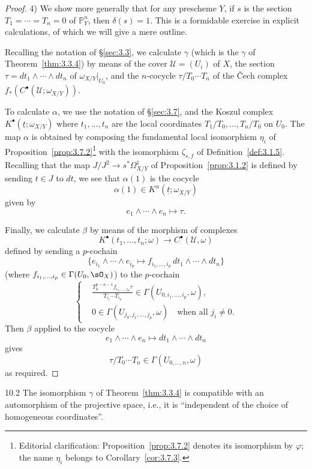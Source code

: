 \begin{proof}
4) We show more generally that for any prescheme $Y$, if $s$ is the section $T_1=\cdots=T_n=0$ of $\mathbb{P}_Y^n$, then $\delta(s)=1$. This is a formidable exercise in explicit calculations, of which we will give a mere outline.

Recalling the notation of \S\ref{sec:3.3}, we calculate $\gamma$ (which is the $\gamma$ of Theorem~\ref{thm:3.3.4}) by means of the cover $\mathcal{U}=(U_i)$ of $X$, the section $\tau=dt_1\wedge\cdots\wedge dt_n$ of $\omega_{X/Y}|_{U_0}$, and the $n$-cocycle $\tau/T_0\cdots T_n$ of the \v{C}ech complex $f_*(C^\bullet(\mathcal{U};\omega_{X/Y}))$.

To calculate $\alpha$, we use the notation of \S\ref{sec:3.7}, and the Koszul complex $K^\bullet(\underline{t};\omega_{X/Y})$ where $t_1,\dots,t_n$ are the local coordinates $T_1/T_0,\dots,T_n/T_0$ on $U_0$. The map $\alpha$ is obtained by composing the fundamental local isomorphism $\eta_i$ of Proposition~\ref{prop:3.7.2}\footnote{Editorial clarification: Proposition~\ref{prop:3.7.2} denotes its isomorphism by $\varphi$; the name $\eta_i$ belongs to Corollary~\ref{cor:3.7.3}.} with the isomorphism $\zeta_{s,f}$ of Definition~\ref{def:3.1.5}. Recalling that the map $J/J^2\to s^*\Omega^1_{X/Y}$ of Proposition~\ref{prop:3.1.2} is defined by sending $t\in J$ to $dt$, we see that $\alpha(1)$ is the cocycle
\[
\alpha(1) \in K^n(\underline{t}; \omega_{X/Y})
\]
given by
\[
e_1\wedge\cdots\wedge e_n \longmapsto \tau.
\]

Finally, we calculate $\beta$ by means of the morphism of complexes
\[
K^\bullet(t_1,\dots,t_n;\omega) \longrightarrow C^\bullet(\mathcal{U},\omega)
\]
defined by sending a $p$-cochain
\[
\bigl\{e_{i_1}\wedge\cdots\wedge e_{i_p} \longmapsto f_{i_1,\dots,i_p}\,dt_1\wedge\cdots\wedge dt_n\bigr\}
\]
(where $f_{i_1,\dots,i_p}\in\Gamma(U_0,\sO_X)$) to the $p$-cochain
\[
\left\{\begin{aligned}
&\frac{T_0^{p-n-1}f_{i_1,\dots,i_p}\tau}{T_{i_1}\cdots T_{i_p}}
  \in \Gamma(U_{0,i_1,\dots,i_p},\omega),\\
&0\in\Gamma(U_{j_0,j_1,\dots,j_p},\omega)
  \quad\text{when all }j_i\neq 0.
\end{aligned}\right.
\]
Then $\beta$ applied to the cocycle
\[
e_1\wedge\cdots\wedge e_n \longmapsto dt_1\wedge\cdots\wedge dt_n
\]
gives
\[
\tau/T_0\cdots T_n \in \Gamma(U_{0,\dots,n},\omega)
\]
as required.
\end{proof}

\begin{bookcorollary}{10.2}\label{cor:3.10.2}
The isomorphism $\gamma$ of Theorem~\ref{thm:3.3.4} is compatible with an automorphism of the projective space, i.e., it is ``independent of the choice of homogeneous coordinates''.
\end{bookcorollary}

